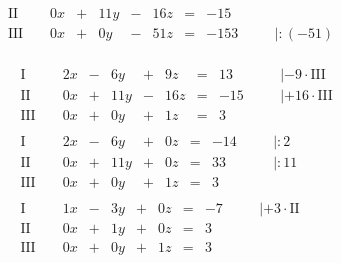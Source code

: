 \begin{exercise}
\begin{minipage}{0.49\linewidth}
\begin{align*}
\begin{array}{r|rrrrrrrrrl}
     \text{II}{\,} & {\,} & \num{0}x & + & \num{11}y & - & \num{16}z & = &  -\num{15} & {\quad} &                          \\
    \text{III}{\,} & {\,} & \num{0}x & + &  \num{0}y & - & \num{51}z & = & -\num{153} & {\quad} & |:\left(-\num{51}\right)
    \end{array}
    \end{align*}
    \end{minipage}%
    \hfill
    \begin{minipage}{0.49\linewidth}
    \vspace*{-\abovedisplayskip}
    \begin{align*}
    &
    \begin{array}{r|rrrrrrrrrl}
      \text{I}{\,} & {\,} & \num{2}x & - &  \num{6}y & + &  \num{9}z & = &  \num{13} & {\quad} & |-\num{9}\cdot\text{III}  \\
     \text{II}{\,} & {\,} & \num{0}x & + & \num{11}y & - & \num{16}z & = & -\num{15} & {\quad} & |+\num{16}\cdot\text{III} \\
    \text{III}{\,} & {\,} & \num{0}x & + &  \num{0}y & + &  \num{1}z & = &   \num{3} & {\quad} &
    \end{array}
    \\[1ex]&
    \begin{array}{r|rrrrrrrrrl}
      \text{I}{\,} & {\,} & \num{2}x & - &  \num{6}y & + & \num{0}z & = & -\num{14} & {\quad} & |:\num{2}  \\
     \text{II}{\,} & {\,} & \num{0}x & + & \num{11}y & + & \num{0}z & = &  \num{33} & {\quad} & |:\num{11} \\
    \text{III}{\,} & {\,} & \num{0}x & + &  \num{0}y & + & \num{1}z & = &   \num{3} & {\quad} &
    \end{array}
    \\[1ex]&
    \begin{array}{r|rrrrrrrrrl}
      \text{I}{\,} & {\,} & \num{1}x & - & \num{3}y & + & \num{0}z & = & -\num{7} & {\quad} & |+\num{3}\cdot\text{II} \\
     \text{II}{\,} & {\,} & \num{0}x & + & \num{1}y & + & \num{0}z & = &  \num{3} & {\quad} &                         \\
    \text{III}{\,} & {\,} & \num{0}x & + & \num{0}y & + & \num{1}z & = &  \num{3} & {\quad} &
    \end{array}
    \\[1ex]&
    \begin{array}{r|rrrrrrrrrl}

\end{array}
\end{align*}
\end{minipage}
\end{exercise}
